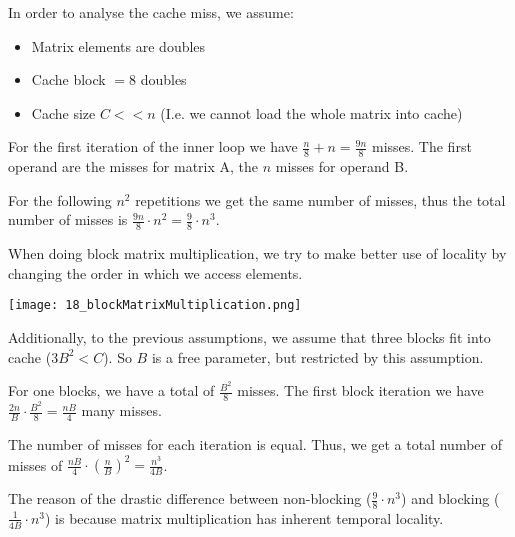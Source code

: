 In order to analyse the cache miss, we assume:
\begin{itemize}
    \item Matrix elements are doubles
    \item Cache block $= 8$ doubles
    \item Cache size $C << n$ (I.e. we cannot load the whole matrix into cache)
\end{itemize}

For the first iteration of the inner loop we have $\frac{n}{8} + n = \frac{9n}{8}$ misses. The first operand are the misses for matrix A, the $n$ misses for operand B.

For the following $n^2$ repetitions we get the same number of misses, thus the total number of misses is $\frac{9n}{8} \cdot n^2 = \frac{9}{8} \cdot n^3$.

When doing block matrix multiplication, we try to make better use of locality by changing the order in which we access elements.

\texttt{[image: 18\_blockMatrixMultiplication.png]}

Additionally, to the previous assumptions, we assume that three blocks fit into cache ($3B^2 < C$). So $B$ is a free parameter, but restricted by this assumption.

For one blocks, we have a total of $\frac{B^2}{8}$ misses. The first block iteration we have $\frac{2n}{B} \cdot \frac{B^2}{8} = \frac{nB}{4}$ many misses.

The number of misses for each iteration is equal. Thus, we get a total number of misses of $\frac{nB}{4} \cdot (\frac{n}{B})^2 = \frac{n^3}{4B}$.

The reason of the drastic difference between non-blocking ($\frac{9}{8} \cdot n^3$) and blocking ($\frac{1}{4B} \cdot n^3$) is because matrix multiplication has inherent temporal locality.
